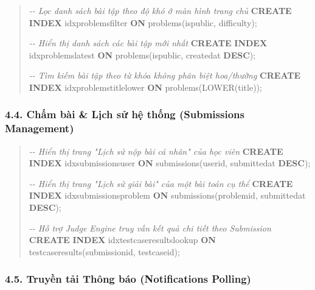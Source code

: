 \documentclass[12pt,a4paper]{article}
\renewcommand{\_}{\BreakableUnderscore}
\newenvironment{Shaded}{\vspace{3pt}\begin{quote}}{\end{quote}\vspace{3pt}}
\newcommand{\CommentTok}[1]{\textcolor[rgb]{0.38,0.63,0.69}{\textit{#1}}}
\newcommand{\FunctionTok}[1]{\textcolor[rgb]{0.02,0.16,0.49}{#1}}
\newcommand{\KeywordTok}[1]{\textcolor[rgb]{0.00,0.44,0.13}{\textbf{#1}}}
\newcommand{\NormalTok}[1]{#1}
\begin{document}
\begin{Shaded}
\begin{Highlighting}[]
\CommentTok{{-}{-} Lọc danh sách bài tập theo độ khó ở màn hình trang chủ}
\KeywordTok{CREATE} \KeywordTok{INDEX}\NormalTok{ idx\_problems\_filter }\KeywordTok{ON}\NormalTok{ problems(is\_public, difficulty);}

\CommentTok{{-}{-} Hiển thị danh sách các bài tập mới nhất}
\KeywordTok{CREATE} \KeywordTok{INDEX}\NormalTok{ idx\_problems\_latest }\KeywordTok{ON}\NormalTok{ problems(is\_public, created\_at }\KeywordTok{DESC}\NormalTok{);}

\CommentTok{{-}{-} Tìm kiếm bài tập theo từ khóa không phân biệt hoa/thường}
\KeywordTok{CREATE} \KeywordTok{INDEX}\NormalTok{ idx\_problems\_title\_lower }\KeywordTok{ON}\NormalTok{ problems(}\FunctionTok{LOWER}\NormalTok{(title));}
\end{Highlighting}
\end{Shaded}

\subsubsection{4.4. Chấm bài \& Lịch sử hệ thống (Submissions Management)}

\begin{Shaded}
\begin{Highlighting}[]
\CommentTok{{-}{-} Hiển thị trang "Lịch sử nộp bài cá nhân" của học viên}
\KeywordTok{CREATE} \KeywordTok{INDEX}\NormalTok{ idx\_submissions\_user }\KeywordTok{ON}\NormalTok{ submissions(user\_id, submitted\_at }\KeywordTok{DESC}\NormalTok{);}

\CommentTok{{-}{-} Hiển thị trang "Lịch sử giải bài" của một bài toán cụ thể}
\KeywordTok{CREATE} \KeywordTok{INDEX}\NormalTok{ idx\_submissions\_problem }\KeywordTok{ON}\NormalTok{ submissions(problem\_id, submitted\_at }\KeywordTok{DESC}\NormalTok{);}

\CommentTok{{-}{-} Hỗ trợ Judge Engine truy vấn kết quả chi tiết theo Submission}
\KeywordTok{CREATE} \KeywordTok{INDEX}\NormalTok{ idx\_testcase\_results\_lookup }\KeywordTok{ON}\NormalTok{ testcase\_results(submission\_id, testcase\_id);}
\end{Highlighting}
\end{Shaded}

\subsubsection{4.5. Truyền tải Thông báo (Notifications Polling)}
\end{document}
